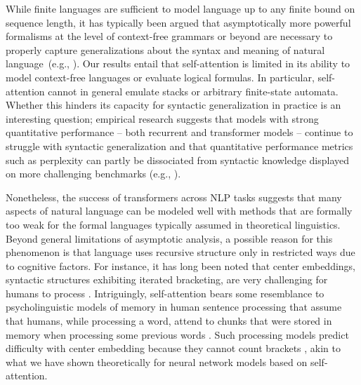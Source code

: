 \documentclass[11pt,a4paper]{article}
\begin{document}
While finite languages are sufficient to model language up to any finite bound on sequence length, it has typically been argued that asymptotically more powerful formalisms at the level of context-free grammars or beyond are necessary to properly capture generalizations about the syntax and meaning of natural language~(e.g., \citet{chomsky1957syntactic,shieber1985evidence}).
Our results entail that self-attention is limited in its ability to model context-free languages or evaluate logical formulas.
In particular, self-attention cannot in general emulate stacks or arbitrary finite-state automata.
Whether this hinders its capacity for syntactic generalization in practice is an interesting question; empirical research suggests that models with strong quantitative performance -- both recurrent and transformer models -- continue to struggle with syntactic generalization and that quantitative performance metrics such as perplexity can partly be dissociated from syntactic knowledge displayed on more challenging benchmarks (e.g., \citet{kuncoro2018lstms,marvin2018targeted, tran2018importance,mccoy2019berts}).

Nonetheless, the success of transformers across NLP tasks suggests that many aspects of natural language can be modeled well with methods that are formally too weak for the formal languages typically assumed in theoretical linguistics.
Beyond general limitations of asymptotic analysis, a possible reason for this phenomenon is that language uses recursive structure only in restricted ways due to cognitive factors.
For instance, it has long been noted that center embeddings, syntactic structures exhibiting iterated bracketing, are very challenging for humans to process \cite{miller-finitary-1963,gibson1999memory}.
Intriguingly, self-attention bears some resemblance to psycholinguistic models of memory in human sentence processing that assume that humans, while processing a word, attend to chunks that were stored in memory when processing some previous words \cite{lewis2005activation,parker2017cue}.
Such processing models predict difficulty with center embedding because they cannot count brackets \cite{lewis2005activation}, akin to what we have shown theoretically for neural network models based on self-attention.
\end{document}

